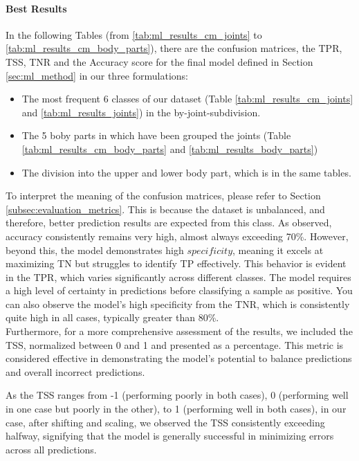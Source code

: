 \paragraph{Best Results}
In the following Tables (from \ref{tab:ml_results_cm_joints} to \ref{tab:ml_results_cm_body_parts}), there are the confusion matrices, the TPR, TSS, TNR and the Accuracy score for the final model defined in Section \ref{sec:ml_method} in our three formulations:
\begin{itemize}
  \item The most frequent 6 classes of our dataset (Table \ref{tab:ml_results_cm_joints} and \ref{tab:ml_results_joints}) in the by-joint-subdivision.
  \item The 5 boby parts in which have been grouped the joints (Table \ref{tab:ml_results_cm_body_parts} and \ref{tab:ml_results_body_parts})
  \item The division into the upper and lower body part, which is in the same tables.
\end{itemize} 
To interpret the meaning of the confusion matrices, please refer to Section \ref{subsec:evaluation_metrics}.
This is because the dataset is unbalanced, and therefore, better prediction results are expected from this class.
As observed, accuracy consistently remains very high, almost always exceeding 70\%.
However, beyond this, the model demonstrates high $specificity$, meaning it excels at maximizing TN but struggles to identify TP effectively.
This behavior is evident in the TPR, which varies significantly across different classes.
The model requires a high level of certainty in predictions before classifying a sample as positive.
You can also observe the model's high specificity from the TNR, which is consistently quite high in all cases, typically greater than 80\%. \\

Furthermore, for a more comprehensive assessment of the results, we included the TSS, normalized between 0 and 1 and presented as a percentage. 
This metric is considered effective in demonstrating the model's potential to balance predictions and overall incorrect predictions.

As the TSS ranges from -1 (performing poorly in both cases), 0 (performing well in one case but poorly in the other), to 1 (performing well in both cases), in our case, after shifting and scaling, 
we observed the TSS consistently exceeding halfway, signifying that the model is generally successful in minimizing errors across all predictions. 

